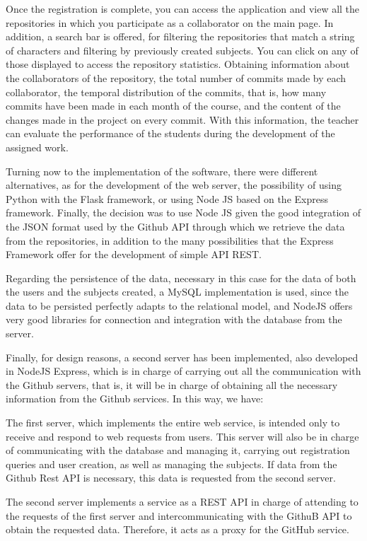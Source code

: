 Once the registration is complete, you can access the application and view all the repositories in which you participate as a collaborator on the main page. In addition, a search bar is offered, for filtering the repositories that match a string of characters and filtering by previously created subjects. You can click on any of those displayed to access the repository statistics. Obtaining information about the collaborators of the repository, the total number of commits made by each collaborator, the temporal distribution of the commits, that is, how many commits have been made in each month of the course, and the content of the changes made in the project on every commit. With this information, the teacher can evaluate the performance of the students during the development of the assigned work.

Turning now to the implementation of the software, there were different alternatives, as for the development of the web server, the possibility of using Python with the Flask framework, or using Node JS based on the Express framework. Finally, the decision was to use Node JS given the good integration of the JSON format used by the Github API through which we retrieve the data from the repositories, in addition to the many possibilities that the Express Framework offer for the development of simple API REST.

Regarding the persistence of the data, necessary in this case for the data of both the users and the subjects created, a MySQL implementation is used, since the data to be persisted perfectly adapts to the relational model, and NodeJS offers very good libraries for connection and integration with the database from the server.

Finally, for design reasons, a second server has been implemented, also developed in NodeJS Express, which is in charge of carrying out all the communication with the Github servers, that is, it will be in charge of obtaining all the necessary information from the Github services. In this way, we have:

    The first server, which implements the entire web service, is intended only to receive and respond to web requests from users. This server will also be in charge of communicating with the database and managing it, carrying out registration queries and user creation, as well as managing the subjects. If data from the Github Rest API is necessary, this data is requested from the second server.

    The second server implements a service as a REST API in charge of attending to the requests of the first server and intercommunicating with the GithuB API to obtain the requested data. Therefore, it acts as a proxy for the GitHub service.


